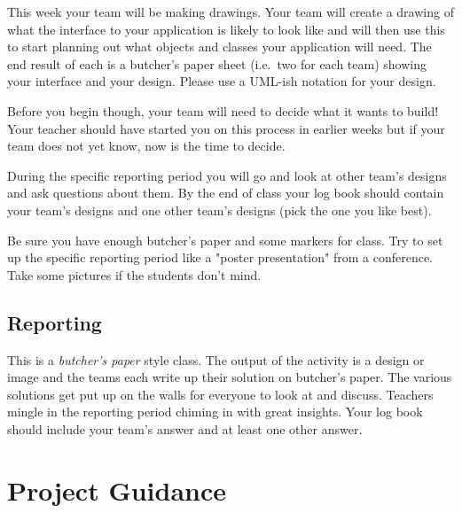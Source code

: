 \documentclass[twoside=false,DIV=14]{scrartcl}
\begin{document}
This week your team will be making drawings.  Your team will create a drawing of what the interface to your application is likely to look like and will then use this to start planning out what objects and classes your application will need.  The end result of each is a butcher's paper sheet (i.e.\ two for each team) showing your interface and your design.  Please use a UML-ish notation for your design.

Before you begin though, your team will need to decide what it wants to build!  Your teacher should have started you on this process in earlier weeks but if your team does not yet know, now is the time to decide.

During the specific reporting period you will go and look at other team's designs and ask questions about them.  By the end of class your log book should contain your team's designs and one other team's designs (pick the one you like best).

\begin{teacher}
Be sure you have enough butcher's paper and some markers for class.  Try to set up the specific reporting period like a "poster presentation" from a conference.  Take some pictures if the students don't mind.
\end{teacher}

\subsection*{Reporting}

This is a \emph{butcher's paper} style class.  The output of the activity is a design or image and the teams each write up their solution on butcher's paper.  The various solutions get put up on the walls for everyone to look at and discuss.  Teachers mingle in the reporting period chiming in with great insights.  Your log book should include your team's answer and at least one other answer.

\section*{Project Guidance}
\end{document}
